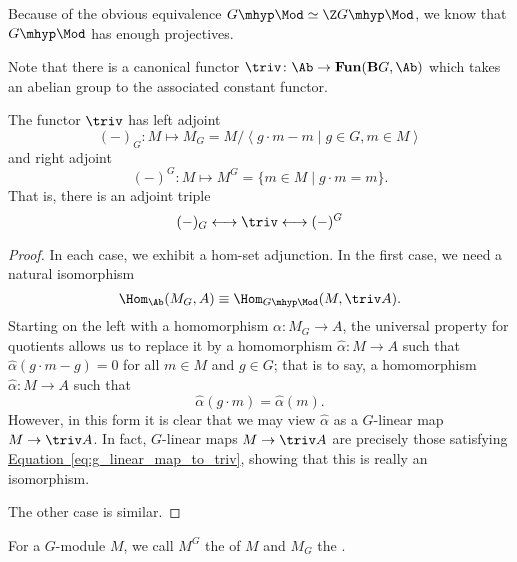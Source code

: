 \documentclass[main.tex]{subfiles}
\begin{document}
Because of the obvious equivalence $G\mhyp\Mod \simeq \Z G\mhyp\Mod$, we know that $G\mhyp\Mod$ has enough projectives.

Note that there is a canonical functor $\triv\colon \Ab \to \mathbf{Fun}(\mathbf{B}G, \Ab)$ which takes an abelian group to the associated constant functor.
\begin{proposition}
  The functor $\triv$ has left adjoint
  \begin{equation*}
    (-)_{G}\colon M \mapsto M_{G} = M/\left\langle g\cdot m - m \mid g \in G, m \in M \right\rangle
  \end{equation*}
  and right adjoint
  \begin{equation*}
    (-)^{G}\colon M \mapsto M^{G} = \{m \in M \mid g\cdot m = m\}.
  \end{equation*}
  That is, there is an adjoint triple
  \begin{equation*}
    (-)_{G} \longleftrightarrow \triv \longleftrightarrow (-)^{G}
  \end{equation*}
\end{proposition}
\begin{proof}
  In each case, we exhibit a hom-set adjunction. In the first case, we need a natural isomorphism
  \begin{equation*}
    \Hom_{\Ab}(M_{G}, A) \equiv \Hom_{G\mhyp\Mod}(M, \triv A).
  \end{equation*}
  Starting on the left with a homomorphism $\alpha\colon M_{G} \to A$, the universal property for quotients allows us to replace it by a homomorphism $\hat{\alpha}\colon M \to A$ such that $\hat{\alpha}(g\cdot m - g) = 0$ for all $m \in M$ and $g \in G$; that is to say, a homomorphism $\hat{\alpha}\colon M \to A$ such that
  \begin{equation}
    \label{eq:g_linear_map_to_triv}
    \hat{\alpha}(g\cdot m) = \hat{\alpha}(m).
  \end{equation}
  However, in this form it is clear that we may view $\hat{\alpha}$ as a $G$-linear map $M \to \triv A$. In fact, $G$-linear maps $M \to \triv A$ are precisely those satisfying \hyperref[eq:g_linear_map_to_triv]{Equation~\ref*{eq:g_linear_map_to_triv}}, showing that this is really an isomorphism.

  The other case is similar.
\end{proof}

\begin{definition}
  \label{def:invariants_coinvariants}
  For a $G$-module $M$, we call $M^{G}$ the  of $M$ and $M_{G}$ the .
\end{definition}
\end{document}
